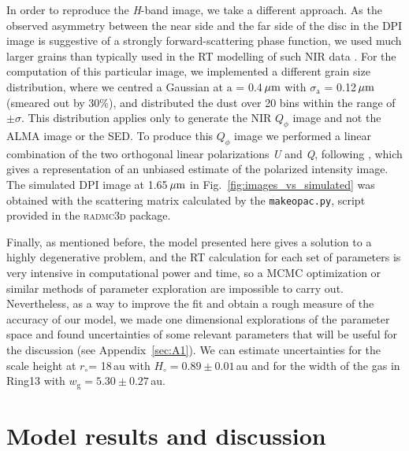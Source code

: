 \documentclass[fleqn,usenatbib,useAMS]{mnras}
\begin{document}
In order to reproduce the \textit{H}-band image, we take a different approach. As the observed asymmetry between the near side and the far side of the disc in the DPI image is suggestive of a strongly forward-scattering phase function, we used much larger grains than typically used in the RT modelling of such NIR data \citep[e.g.,][]{2018MNRAS.477.5104C}. For the computation of this particular image, we implemented a different grain size distribution, where we centred a Gaussian at $\mathrm{a}$ = 0.4\,$\hbox{$\mu$m}$ with $\sigma_{\mathrm{a}}$ = 0.12\,$\hbox{$\mu$m}$ (smeared out by 30\%), and distributed the dust over 20 bins within the range of $\pm \sigma$. This distribution applies only to generate the NIR $Q_\phi$ image and not the ALMA image or the SED. To produce this $Q_\phi$ image we performed a linear combination of the two orthogonal linear polarizations \textit{U} and \textit{Q}, following \citet{Avenhaus_2017}, which gives a representation of an unbiased estimate of the polarized intensity image. The simulated DPI image at 1.65\,$\hbox{$\mu$m}$ in Fig.~\ref{fig:images_vs_simulated} was obtained with the scattering matrix calculated by the {\tt makeopac.py}, script provided in the \textsc{radmc3d} package.

Finally, as mentioned before, the model presented here gives a solution to a highly degenerative problem, and the RT calculation for each set of parameters is very intensive in computational power and time, so a MCMC optimization or similar methods of parameter exploration are impossible to carry out. Nevertheless, as a way to improve the fit and obtain a rough measure of the accuracy of our model, we made one dimensional explorations of the parameter space and found uncertainties of some relevant parameters that will be useful for the discussion (see Appendix~\ref{sec:A1}). We can estimate uncertainties for the scale height at $r_\circ$= 18\,au with $H_\circ = 0.89\pm0.01$\,au and for the width of the gas in Ring13 with $w_\mathrm{g} = 5.30\pm0.27$\,au.

\section{Model results and discussion} \label{sec:results}
\end{document}
